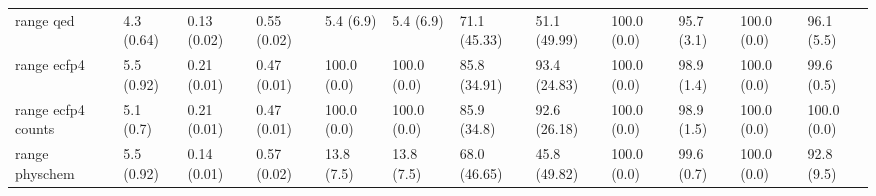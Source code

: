 \begin{tabular}{llllllllllll}
range qed & {\cellcolor[HTML]{F0F9FB}} \color[HTML]{000000} 4.3 (0.64) & {\cellcolor[HTML]{F4FBFC}} \color[HTML]{000000} 0.13 (0.02) & {\cellcolor[HTML]{57BA92}} \color[HTML]{F1F1F1} 0.55 (0.02) & {\cellcolor[HTML]{F0F9FB}} \color[HTML]{000000} 5.4 (6.9) & {\cellcolor[HTML]{F0F9FB}} \color[HTML]{000000} 5.4 (6.9) & {\cellcolor[HTML]{2C9553}} \color[HTML]{F1F1F1} 71.1 (45.33) & {\cellcolor[HTML]{63C0A0}} \color[HTML]{000000} 51.1 (49.99) & {\cellcolor[HTML]{00441B}} \color[HTML]{F1F1F1} 100.0 (0.0) & {\cellcolor[HTML]{005221}} \color[HTML]{F1F1F1} 95.7 (3.1) & {\cellcolor[HTML]{00441B}} \color[HTML]{F1F1F1} 100.0 (0.0) & {\cellcolor[HTML]{005020}} \color[HTML]{F1F1F1} 96.1 (5.5) \\
range ecfp4 & {\cellcolor[HTML]{F0F9FB}} \color[HTML]{000000} 5.5 (0.92) & {\cellcolor[HTML]{E3F4F8}} \color[HTML]{000000} 0.21 (0.01) & {\cellcolor[HTML]{72C7AD}} \color[HTML]{000000} 0.47 (0.01) & {\cellcolor[HTML]{00441B}} \color[HTML]{F1F1F1} 100.0 (0.0) & {\cellcolor[HTML]{00441B}} \color[HTML]{F1F1F1} 100.0 (0.0) & {\cellcolor[HTML]{05712F}} \color[HTML]{F1F1F1} 85.8 (34.91) & {\cellcolor[HTML]{005924}} \color[HTML]{F1F1F1} 93.4 (24.83) & {\cellcolor[HTML]{00441B}} \color[HTML]{F1F1F1} 100.0 (0.0) & {\cellcolor[HTML]{00471C}} \color[HTML]{F1F1F1} 98.9 (1.4) & {\cellcolor[HTML]{00441B}} \color[HTML]{F1F1F1} 100.0 (0.0) & {\cellcolor[HTML]{00451C}} \color[HTML]{F1F1F1} 99.6 (0.5) \\
range ecfp4 counts & {\cellcolor[HTML]{EFF9FB}} \color[HTML]{000000} 5.1 (0.7) & {\cellcolor[HTML]{E3F4F7}} \color[HTML]{000000} 0.21 (0.01) & {\cellcolor[HTML]{72C7AD}} \color[HTML]{000000} 0.47 (0.01) & {\cellcolor[HTML]{00441B}} \color[HTML]{F1F1F1} 100.0 (0.0) & {\cellcolor[HTML]{00441B}} \color[HTML]{F1F1F1} 100.0 (0.0) & {\cellcolor[HTML]{05712F}} \color[HTML]{F1F1F1} 85.9 (34.8) & {\cellcolor[HTML]{005B25}} \color[HTML]{F1F1F1} 92.6 (26.18) & {\cellcolor[HTML]{00441B}} \color[HTML]{F1F1F1} 100.0 (0.0) & {\cellcolor[HTML]{00471C}} \color[HTML]{F1F1F1} 98.9 (1.5) & {\cellcolor[HTML]{00441B}} \color[HTML]{F1F1F1} 100.0 (0.0) & {\cellcolor[HTML]{00441B}} \color[HTML]{F1F1F1} 100.0 (0.0) \\
range physchem & {\cellcolor[HTML]{F3FAFC}} \color[HTML]{000000} 5.5 (0.92) & {\cellcolor[HTML]{E5F5F9}} \color[HTML]{000000} 0.14 (0.01) & {\cellcolor[HTML]{4FB688}} \color[HTML]{F1F1F1} 0.57 (0.02) & {\cellcolor[HTML]{E3F4F7}} \color[HTML]{000000} 13.8 (7.5) & {\cellcolor[HTML]{E3F4F7}} \color[HTML]{000000} 13.8 (7.5) & {\cellcolor[HTML]{339E60}} \color[HTML]{F1F1F1} 68.0 (46.65) & {\cellcolor[HTML]{77C9B0}} \color[HTML]{000000} 45.8 (49.82) & {\cellcolor[HTML]{00441B}} \color[HTML]{F1F1F1} 100.0 (0.0) & {\cellcolor[HTML]{00451C}} \color[HTML]{F1F1F1} 99.6 (0.7) & {\cellcolor[HTML]{00441B}} \color[HTML]{F1F1F1} 100.0 (0.0) & {\cellcolor[HTML]{005B25}} \color[HTML]{F1F1F1} 92.8 (9.5) \\

\end{tabular}
